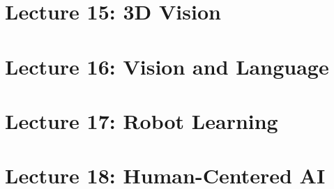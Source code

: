 \documentclass[a4paper]{article}
\begin{document}
\section{Lecture 15: 3D Vision}


\section{Lecture 16: Vision and Language}


\section{Lecture 17: Robot Learning}


\section{Lecture 18: Human-Centered AI}

\end{document}
